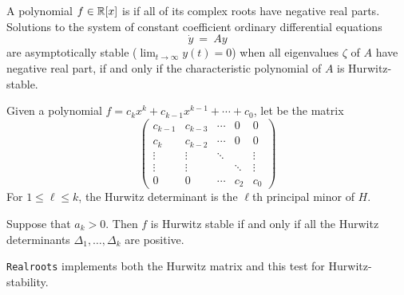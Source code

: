 A polynomial $f\in\mathbb{R}[x]$ is  if all of its complex roots have negative real parts.
Solutions to the system of constant coefficient ordinary differential equations 
%
 \[
  \dot{y}\ =\ Ay
 \]
%
are asymptotically stable ($\lim_{t\to\infty}y(t)=0$) when all eigenvalues $\zeta$ of $A$ have negative real part,
if and only if the characteristic polynomial of $A$ is Hurwitz-stable.
 
Given a polynomial $f=c_kx^k+c_{k-1}x^{k-1}+\dotsb+c_0$,  let  be the matrix
\[
\left(\begin{matrix}
  c_{k-1} & c_{k-3} & \dotsb & 0  & 0 \\
  c_k    & c_{k-2} &  \dotsb& 0 & 0 \\
  \vdots & \vdots & \ddots&    &\vdots\\
  \vdots & \vdots & & \ddots&\vdots\\
    0    &    0   & \dotsb&c_2 & c_0
\end{matrix}\right)
\]
For $1\leq \ell\leq k$, the Hurwitz determinant  is the $\ell$th principal minor of $H$. 


\begin{theorem}
  Suppose that $a_k>0$.
  Then $f$ is Hurwitz stable if and only if all the Hurwitz determinants $\Delta_{1},\dots,\Delta_{k}$ are positive.
\end{theorem}

{\tt Realroots} implements both the Hurwitz matrix and this test for Hurwitz-stability.
%
\begin{leftbar}

\end{leftbar}
%

